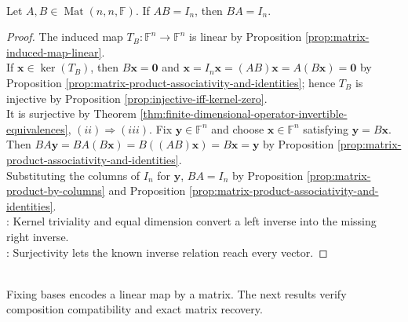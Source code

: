 \begin{theorem} \label{thm:square-one-sided-inverse-is-two-sided} \\
Let $A,B\in\operatorname{Mat}(n,n,\mathbb{F})$. If $AB=I_n$, then $BA=I_n$.
\begin{proof}
The induced map $T_B:\mathbb{F}^n\to\mathbb{F}^n$ is linear by Proposition \ref{prop:matrix-induced-map-linear}.\\
If $\mathbf{x}\in\ker(T_B)$, then $B\mathbf{x}=\mathbf{0}$ and $\mathbf{x}=I_n\mathbf{x}=(AB)\mathbf{x}=A(B\mathbf{x})=\mathbf{0}$ by Proposition \ref{prop:matrix-product-associativity-and-identities}; hence $T_B$ is injective by Proposition \ref{prop:injective-iff-kernel-zero}.\\
It is surjective by Theorem \ref{thm:finite-dimensional-operator-invertible-equivalences}, $(ii)\Rightarrow(iii)$. Fix $\mathbf{y}\in\mathbb{F}^n$ and choose $\mathbf{x}\in\mathbb{F}^n$ satisfying $\mathbf{y}=B\mathbf{x}$.\\
Then $BA\mathbf{y}=BA(B\mathbf{x})=B((AB)\mathbf{x})=B\mathbf{x}=\mathbf{y}$ by Proposition \ref{prop:matrix-product-associativity-and-identities}.\\
Substituting the columns of $I_n$ for $\mathbf{y}$, $BA=I_n$ by Proposition \ref{prop:matrix-product-by-columns} and Proposition \ref{prop:matrix-product-associativity-and-identities}.\\
: Kernel triviality and equal dimension convert a left inverse into the missing right inverse.\\
: Surjectivity lets the known inverse relation reach every vector.
\end{proof}
\end{theorem}

\begin{motivation} \\
Fixing bases encodes a linear map by a matrix. The next results verify composition compatibility and exact matrix recovery.
\end{motivation}


